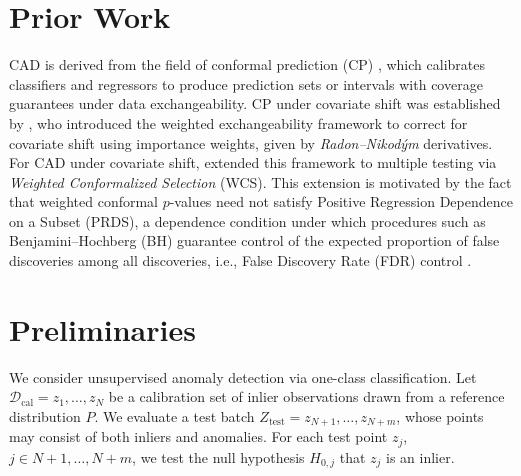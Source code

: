 
\section{Prior Work}\label{sec:prior_works}

CAD \cite{Bates2023,Laxhammar2010} is derived from the field of conformal prediction (CP) \cite{Vovk2005,Shafer2008}, which calibrates classifiers and regressors to produce prediction sets or intervals with coverage guarantees under data exchangeability. CP under covariate shift was established by \citet{Tibshirani2019}, who introduced the weighted exchangeability framework to correct for covariate shift using importance weights, given by \textit{Radon--Nikod{\'y}m} derivatives. For CAD under covariate shift, \citet{Jin2025} extended this framework to multiple testing via \textit{Weighted Conformalized Selection} (WCS). This extension is motivated by the fact that weighted conformal $p$-values need not satisfy Positive Regression Dependence on a Subset (PRDS), a dependence condition under which procedures such as Benjamini--Hochberg (BH) guarantee control of the expected proportion of false discoveries among all discoveries, i.e., False Discovery Rate (FDR) control \cite{Hochberg1995}.

\section{Preliminaries}\label{sec:preliminaries}

We consider unsupervised anomaly detection via one-class classification. Let $\mathcal{D}_{\mathrm{cal}}={z_1,\dots,z_N}$ be a calibration set of inlier observations drawn from a reference distribution $P$. We evaluate a test batch $Z_{\mathrm{test}}={z_{N+1},\dots,z_{N+m}}$, whose points may consist of both inliers and anomalies. For each test point $z_j$, $j\in{N+1,\ldots,N+m}$, we test the null hypothesis $H_{0,j}$ that $z_j$ is an inlier.

